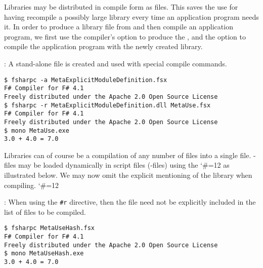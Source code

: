 Libraries may be distributed in compile form as  files. This saves the use for having recompile a possibly large library every time an application program needs it. In order to produce a library file from  and then compile an application program, we first use the compiler's  option to produce the , and the  option to compile the application program with the newly created library.
\begin{codeNOutput}{: A stand-alone  file is created and used with special compile commands.}
\begin{lstlisting}[language=console,escapechar=§]
$ fsharpc -a MetaExplicitModuleDefinition.fsx
F# Compiler for F# 4.1
Freely distributed under the Apache 2.0 Open Source License
$ fsharpc -r MetaExplicitModuleDefinition.dll MetaUse.fsx 
F# Compiler for F# 4.1
Freely distributed under the Apache 2.0 Open Source License
$ mono MetaUse.exe 
3.0 + 4.0 = 7.0
\end{lstlisting}%
\end{codeNOutput}
Libraries can of course be a compilation of any number of files into a single  file. -files may be loaded dynamically in script files (-files) using the 
\begingroup %
\catcode`\#=12
\endgroup
as illustrated below.
%
%
We may now omit the explicit mentioning of the library when compiling.
\begingroup %
\catcode`\#=12
\begin{codeNOutput}{: When using the \lstinline{#r} directive, then the  file need not be explicitly included in the list of files to be compiled.}
\begin{lstlisting}[language=console,escapechar=§]
$ fsharpc MetaUseHash.fsx 
F# Compiler for F# 4.1
Freely distributed under the Apache 2.0 Open Source License
$ mono MetaUseHash.exe 
3.0 + 4.0 = 7.0
\end{lstlisting}
\end{codeNOutput}
